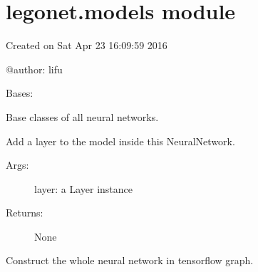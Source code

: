\documentclass[letterpaper,10pt,english]{sphinxmanual}
\begin{document}
\section{legonet.models module}
\label{legonet:module-legonet.models}\label{legonet:legonet-models-module}
Created on Sat Apr 23 16:09:59 2016

@author: lifu

\begin{fulllineitems}
\label{legonet:legonet.models.NeuralNetwork}
Bases: 

Base classes of all neural networks.

\begin{fulllineitems}
\label{legonet:legonet.models.NeuralNetwork.add}
Add a layer to the model inside this NeuralNetwork.
\begin{description}
\item[{Args:}] \leavevmode
layer: a Layer instance

\item[{Returns:}] \leavevmode
None

\end{description}

\end{fulllineitems}


\begin{fulllineitems}
\label{legonet:legonet.models.NeuralNetwork.build}
Construct the whole neural network in tensorflow graph.

\end{fulllineitems}



\end{fulllineitems}
\end{document}
